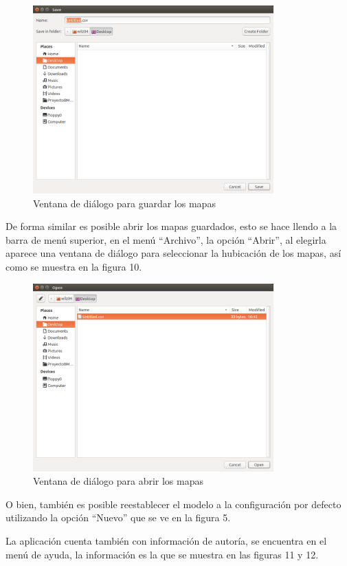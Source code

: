 \documentclass{article}
\begin{document}
	\begin{figure}[h!]
		\centering
			\includegraphics[width=350px, keepaspectratio=false]{report6}
				\caption{Ventana de diálogo para guardar los mapas}
	\end{figure}
	
	De forma similar es posible abrir los mapas guardados, esto se hace llendo a la barra de menú superior, en el menú ``Archivo'', la opción ``Abrir'', al elegirla aparece una ventana de diálogo para seleccionar la hubicación de los mapas, así como se muestra en la figura 10.
	
	\begin{figure}[h!]
		\centering
			\includegraphics[width=350px, keepaspectratio=false]{report7}
				\caption{Ventana de diálogo para abrir los mapas}
	\end{figure}
	
	O bien, también es posible reestablecer el modelo a la configuración por defecto utilizando la opción ``Nuevo'' que se ve en la figura 5.
	
	La aplicación cuenta también con información de autoría, se encuentra en el menú de ayuda, la información es la que se muestra en las figuras 11 y 12.
	
\end{document}

